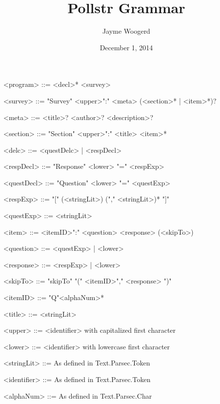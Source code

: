 \documentclass{article}
\title{Pollstr Grammar}
\author{Jayme Woogerd}
\date{December 1, 2014}
\begin{document}
\maketitle
\thispagestyle{empty}

\begin{grammar}

    <program>    ::= <decl>* <survey>

    <survey>     ::= "Survey"  <upper>":" <meta> (<section>* | <item>*)?

    <meta>       ::= <title>? <author>? <description>?

    <section>    ::= "Section" <upper>":" <title> <item>* 

    <delc>       ::= <questDelc> | <respDecl>

    <respDecl>   ::= "Response" <lower> "=" <respExp>

    <questDecl>  ::= "Question" <lower> "=" <questExp>

    <respExp>    ::= "[" (<stringLit>) ("," <stringLit>)* "]"

    <questExp>   ::= <stringLit>

    <item>       ::= <itemID>":" <question> <response> (<skipTo>)

    <question>   ::= <questExp> | <lower>

    <response>   ::= <respExp> | <lower>

    <skipTo>     ::= "skipTo" "(" <itemID>"," <response> ")"

    <itemID>     ::= "Q"<alphaNum>*

    <title>      ::= <stringLit>

    <upper>      ::= <identifier> with capitalized first character
    
    <lower>      ::= <identifier> with lowercase first character

    <stringLit>  ::= As defined in Text.Parsec.Token

    <identifier> ::= As defined in Text.Parsec.Token

    <alphaNum> ::= As defined in Text.Parsec.Char


\end{grammar}
\end{document}

